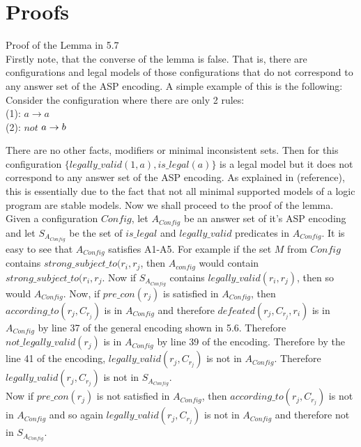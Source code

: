 \section{Proofs}\label{sec:proofs}

Proof of the Lemma in 5.7\\
Firstly note, that the converse of the lemma is false. That is, there are configurations and legal models of those configurations that do not correspond to any answer set of the ASP encoding. A simple example of this is the following: Consider the configuration where there are only 2 rules:\\ (1): $a\rightarrow a$\\
(2): $not$ $a\rightarrow b\\$

There are no other facts, modifiers or minimal inconsistent sets. Then for this configuration $\{legally\_valid(1,a), is\_legal(a)\}$ is a legal model but it does not correspond to any answer set of the ASP encoding. As explained in (reference), this is essentially due to the fact that not all minimal supported models of a logic program are stable models. Now we shall proceed to the proof of the lemma.\\

Given a configuration $Config$, let $A_{Config}$ be an answer set of it's ASP encoding and let $S_{A_{Config}}$ be the set of $is\_legal$ and $legally\_valid$ predicates in $A_{Config}$. It is easy to see that $A_{Config}$ satisfies A1-A5. For example if the set $M$ from $Config$ contains $strong\_subject\_to(r_{i}, r_{j}$, then $A_{config}$ would contain $strong\_subject\_to(r_{i}, r_{j}$. Now if $S_{A_{Config}}$ contains $legally\_valid(r_{i}, r_{j})$, then so would $A_{Config}$. Now, if $pre\_con(r_{j})$ is satisfied in $A_{Config}$, then $according\_to(r_{j},C_{r_{j}})$ is in $A_{Config}$ and therefore $defeated(r_{j}, C_{r_{j}}, r_{i})$ is in $A_{Config}$ by line 37 of the general encoding shown in 5.6. Therefore $not\_legally\_valid(r_{j})$ is in $A_{Config}$ by line 39 of the encoding. Therefore by the line 41 of the encoding, $legally\_valid(r_{j},C_{r_{j}})$ is not in $A_{Config}$. Therefore $legally\_valid(r_{j},C_{r_{j}})$ is not in $S_{A_{Config}}$.\\

Now if $pre\_con(r_{j})$ is not satisfied in $A_{Config}$, then $according\_to(r_{j},C_{r_{j}})$ is not in $A_{Config}$ and so again $legally\_valid(r_{j},C_{r_{j}})$ is not in $A_{Config}$ and therefore not in $S_{A_{Config}}$.\\

